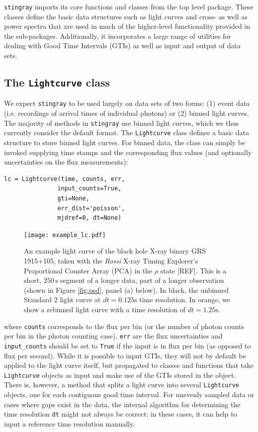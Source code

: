 \documentclass[12pt]{emulateapj}
\newcommand{\stingray}{\texttt{stingray}\xspace}
\newcommand{\lightcurve}{\texttt{Lightcurve}\xspace}
\begin{document}
\stingray imports its core functions and classes from the top level package. 
These classes define the basic data structures such as light curves and cross- as well as power spectra that are used in much of the higher-level functionality provided in the sub-packages. 
Additionally, it incorporates a large range of utilities for dealing with Good Time Intervals (GTIs) as well as input and output of data sets. 

\subsection{The \texttt{Lightcurve} class}
\label{sec:lightcurve}

We expect \stingray to be used largely on data sets of two forms: (1) event data (i.e. recordings of arrival times of individual photons) or (2) binned light curves. 
The majority of methods in \stingray use binned light curves, which we thus currently consider the default format. The \lightcurve class defines a basic data structure to store binned light curves. For binned data, the class can simply be invoked supplying time stamps and the corresponding flux values (and optionally uncertainties on the flux measurements):

\begin{verbatim}
lc = Lightcurve(time, counts, err, 
		       input_counts=True, 
		       gti=None, 
		       err_dist='poisson', 
		       mjdref=0, dt=None)
\end{verbatim}

\begin{figure}[htbp]
\begin{center}
\texttt{[image: example\_lc.pdf]}
\caption{An example light curve of the black hole X-ray binary GRS 1915+105, taken with the \textit{Rossi} X-ray Timing Explorer's Proportional Counter Array (PCA) in the $\rho$ state [REF]. This is a short, $250\,\mathrm{s}$ segment of a longer data, part of a longer observation (shown in Figure \ref{fig:psd}, panel (a) below). In black, the unbinned Standard 2 light curve at $dt = 0.125\mathrm{s}$ time resolution. In orange, we show a rebinned light curve with a time resolution of $dt = 1.25\mathrm{s}$.}
\label{fig:lc}
\end{center}
\end{figure}


where \texttt{counts} corresponds to the flux per bin (or the number of photon counts per bin in the photon counting case), \texttt{err} are the flux uncertainties and \verb|input_counts| should be set to \texttt{True} if the input is in flux per bin (as opposed to flux per second). While it is possible to input GTIs, they will not by default be applied to the light curve itself, but propagated to classes and functions that take \lightcurve objects as input and make use of the GTIs stored in the object. There is, however, a method that splits a light curve into several \lightcurve objects, one for each contiguous good time interval. For unevenly sampled data or cases where gaps exist in the data, the internal algorithm for determining the time resolution \texttt{dt} might not always be correct; in these cases, it can help to input a reference time resolution manually.
\end{document}
